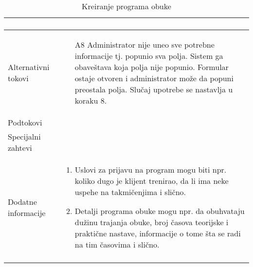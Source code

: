 \documentclass[../../main.tex]{subfiles}
\begin{document}
\begin{longtable}{| p{} | p{} |}
\begin{enumerate}
    \end{enumerate}\\
\hline
    Alternativni tokovi & 
    \begin{itemize}
        \item[A8] Administrator nije uneo sve potrebne informacije tj. popunio sva polja. Sistem ga obaveštava koja polja nije popunio. Formular ostaje otvoren i administrator može da popuni preostala polja. Slučaj upotrebe se nastavlja u koraku 8.
    \end{itemize} \\
\hline
    Podtokovi & \\
\hline
    Specijalni zahtevi & \\
\hline
    Dodatne informacije &
    \begin{enumerate}
        \item Uslovi za prijavu na program mogu biti npr. koliko dugo je klijent trenirao, da li ima neke uspehe na takmičenjima i slično. 
        \item Detalji programa obuke mogu npr. da obuhvataju dužinu trajanja obuke, broj časova teorijske i praktične nastave, informacije o tome šta se radi na tim časovima i slično.
    \end{enumerate}\\
\hline
\caption{Kreiranje programa obuke}
\end{longtable}
\end{document}
